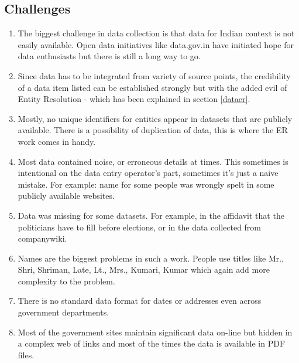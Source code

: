 \subsection{Challenges}

\begin{enumerate}

    \item  The biggest challenge in data collection is that data for Indian context is not easily available.  Open data initiatives like data.gov.in have initiated hope for data enthusiasts but there is still a long way to go. 

    \item Since data has to be integrated from variety of source points, the credibility of a data item listed can be established strongly but with the added evil of Entity Resolution - which has been explained in section \ref{dataer}. 

    \item Mostly, no unique identifiers for entities appear in datasets that are publicly available. There is a possibility of duplication of data, this is where the ER work comes in handy.  

    \item Most data contained noise, or erroneous details at times. This sometimes is intentional on the data entry operator's part, sometimes it's just a naive mistake. For example: name for some people was wrongly spelt in some publicly available websites.

    \item Data was missing for some datasets. For example, in the affidavit that the politicians have to fill before elections, or in the data collected from companywiki.

    \item Names are the biggest problems in such a work. People use titles like Mr., Shri, Shriman, Late, Lt., Mrs., Kumari, Kumar which again add more complexity to the problem. 

    \item There is no standard data format for dates or addresses even across government departments. 

    \item Most of the government sites maintain significant data on-line but hidden in a complex web of links and most of the times the data is available in PDF files.


\end{enumerate}


